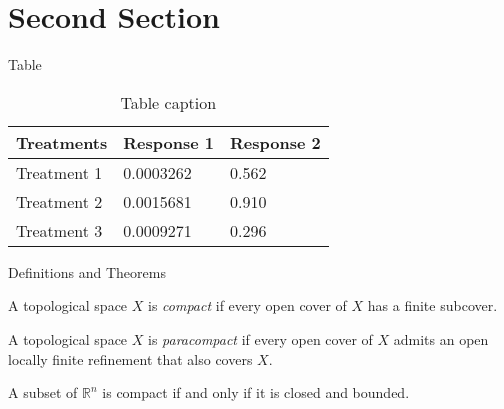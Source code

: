 \documentclass[aspectratio=169,xcolor=dvipsnames]{beamer}
\begin{document}
\section{Second Section}

\begin{frame}{Table}
    \begin{table}
        \begin{tabular}{l l l}
            \toprule
            \textbf{Treatments} & \textbf{Response 1} & \textbf{Response 2} \\
            \midrule
            Treatment 1         & 0.0003262           & 0.562               \\
            Treatment 2         & 0.0015681           & 0.910               \\
            Treatment 3         & 0.0009271           & 0.296               \\
            \bottomrule
        \end{tabular}
        \caption{Table caption}
    \end{table}
\end{frame}


\begin{frame}{Definitions and Theorems}
    \begin{definition}[Compactness]
        A topological space $X$ is \emph{compact} if every open cover of $X$ has a finite subcover.
    \end{definition}
    \begin{definition}[Paracompactness]
        A topological space $X$ is \emph{paracompact} if every open cover of $X$ admits an open locally finite refinement that also covers $X$.
    \end{definition}
    \begin{theorem}
        A subset of $\mathbb{R}^n$ is compact if and only if it is closed and bounded.
    \end{theorem}
\end{frame}

\end{document}
